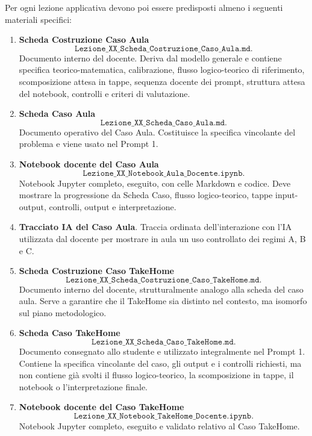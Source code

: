 \documentclass[12pt,a4paper]{article}%
\newcommand{\1}{\mathbf{1}}
\begin{document}
Per ogni lezione applicativa devono poi essere predisposti almeno i seguenti
materiali specifici:
\begin{enumerate}
\item \textbf{Scheda Costruzione Caso Aula}
\[
\texttt{Lezione\_XX\_Scheda\_Costruzione\_Caso\_Aula.md}.
\]
Documento interno del docente. Deriva dal modello generale e contiene
specifica teorico-matematica, calibrazione, flusso logico-teorico di
riferimento, scomposizione attesa in tappe, sequenza docente dei prompt,
struttura attesa del notebook, controlli e criteri di valutazione.

\item \textbf{Scheda Caso Aula}
\[
\texttt{Lezione\_XX\_Scheda\_Caso\_Aula.md}.
\]
Documento operativo del Caso Aula. Costituisce la specifica vincolante del
problema e viene usato nel Prompt 1.

\item \textbf{Notebook docente del Caso Aula}
\[
\texttt{Lezione\_XX\_Notebook\_Aula\_Docente.ipynb}.
\]
Notebook Jupyter completo, eseguito, con celle Markdown e codice. Deve
mostrare la progressione da Scheda Caso, flusso logico-teorico, tappe
input-output, controlli, output e interpretazione.

\item \textbf{Tracciato IA del Caso Aula}.
Traccia ordinata dell'interazione con l'IA utilizzata dal docente per
mostrare in aula un uso controllato dei regimi A, B e C.

\item \textbf{Scheda Costruzione Caso TakeHome}
\[
\texttt{Lezione\_XX\_Scheda\_Costruzione\_Caso\_TakeHome.md}.
\]
Documento interno del docente, strutturalmente analogo alla scheda del caso
aula. Serve a garantire che il TakeHome sia distinto nel contesto, ma
isomorfo sul piano metodologico.

\item \textbf{Scheda Caso TakeHome}
\[
\texttt{Lezione\_XX\_Scheda\_Caso\_TakeHome.md}.
\]
Documento consegnato allo studente e utilizzato integralmente nel Prompt 1.
Contiene la specifica vincolante del caso, gli output e i controlli richiesti,
ma non contiene gi\`{a} svolti il flusso logico-teorico, la scomposizione in tappe, il notebook o l'interpretazione finale.

\item \textbf{Notebook docente del Caso TakeHome}
\[
\texttt{Lezione\_XX\_Notebook\_TakeHome\_Docente.ipynb}.
\]
Notebook Jupyter completo, eseguito e validato relativo al Caso TakeHome.



\end{enumerate}
\end{document}
